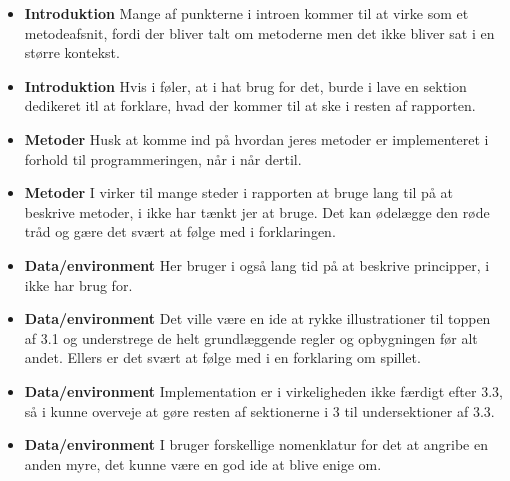 \documentclass[11pt, fleqn, titlepage]{article}
\begin{document}
\begin{itemize}
		\item \textbf{Introduktion} Mange af punkterne i introen kommer til at virke som et metodeafsnit, fordi der bliver talt om metoderne men det ikke bliver sat i en større kontekst.
		
		\item \textbf{Introduktion} Hvis i føler, at i hat brug for det, burde i lave en sektion dedikeret itl at forklare, hvad der kommer til at ske i resten af rapporten.
		
		\item \textbf{Metoder} Husk at komme ind på hvordan jeres metoder er implementeret i forhold til programmeringen, når i når dertil.
		
		\item \textbf{Metoder} I virker til mange steder i rapporten at bruge lang til på at beskrive metoder, i ikke har tænkt jer at bruge. Det kan ødelægge den røde tråd og gære det svært at følge med i forklaringen.
		
		\item \textbf{Data/environment} Her bruger i også lang tid på at beskrive principper, i ikke har brug for.
		
		\item \textbf{Data/environment} Det ville være en ide at rykke illustrationer til toppen af 3.1 og understrege de helt grundlæggende regler og opbygningen før alt andet. Ellers er det svært at følge med i en forklaring om spillet.
		
		\item \textbf{Data/environment} Implementation er i virkeligheden ikke færdigt efter 3.3, så i kunne overveje at gøre resten af sektionerne i 3 til undersektioner af 3.3.
		
		\item \textbf{Data/environment} I bruger forskellige nomenklatur for det at angribe en anden myre, det kunne være en god ide at blive enige om.
		
	\end{itemize}
	
	
\end{document}

